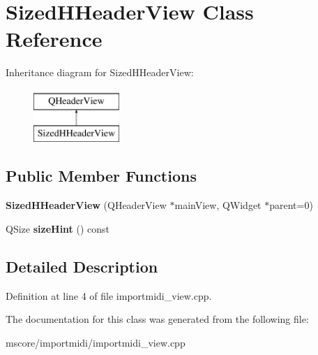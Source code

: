 \hypertarget{class_sized_h_header_view}{}\section{Sized\+H\+Header\+View Class Reference}
\label{class_sized_h_header_view}
Inheritance diagram for Sized\+H\+Header\+View\+:\begin{figure}[H]
\begin{center}
\leavevmode
\includegraphics[height=2.000000cm]{class_sized_h_header_view}
\end{center}
\end{figure}
\subsection*{Public Member Functions}
\begin{DoxyCompactItemize}
\item 
\mbox{\label{class_sized_h_header_view_ad4598c43b458b5b2790a8967e7a58b3e}} 
{\bfseries Sized\+H\+Header\+View} (Q\+Header\+View $\ast$main\+View, Q\+Widget $\ast$parent=0)
\item 
\mbox{\label{class_sized_h_header_view_abee8a1bbb62fe2724031240995d42b9d}} 
Q\+Size {\bfseries size\+Hint} () const
\end{DoxyCompactItemize}


\subsection{Detailed Description}


Definition at line 4 of file importmidi\+\_\+view.\+cpp.



The documentation for this class was generated from the following file\+:\begin{DoxyCompactItemize}
\item 
mscore/importmidi/importmidi\+\_\+view.\+cpp\end{DoxyCompactItemize}
